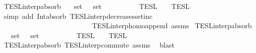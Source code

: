 \begin{isabellebody}
\endisatagproof
{\isafoldproof}%
%
\isadelimproof
\isanewline
%
\endisadelimproof
\isanewline
{}\isamarkupfalse%
\ TESL{\isacharunderscore}interp{\isacharunderscore}absorb{}{\isacharcolon}\isanewline
\ \ \ {\isacartoucheopen}set\ {\isasymPhi}\ {\isasymsubseteq}\ set\ {\isasymPhi}\isanewline
\ \ \ \ \ {\isacartoucheopen}{\isasymlbrakk}{\isasymlbrakk}\ {\isasymPhi}\ {\isacharat}\ {\isasymPhi}\ {\isasymrbrakk}{\isasymrbrakk}\isactrlsub T\isactrlsub E\isactrlsub S\isactrlsub L\ {\isacharequal}\ {\isasymlbrakk}{\isasymlbrakk}\ {\isasymPhi}\ {\isasymrbrakk}{\isasymrbrakk}\isactrlsub T\isactrlsub E\isactrlsub S\isactrlsub L{\isacartoucheclose}\isanewline
%
\isadelimproof
%
\endisadelimproof
%
\isatagproof
{}\isamarkupfalse%
\ {\isacharparenleft}simp\ add{\isacharcolon}\ Int{\isacharunderscore}absorb{}\ TESL{\isacharunderscore}interp{\isacharunderscore}decreases{\isacharunderscore}setinc\isanewline
\ \ \ \ \ \ \ \ \ \ \ \ \ \ \ \ \ \ \ \ \ \ \ \ \ \ TESL{\isacharunderscore}interp{\isacharunderscore}homo{\isacharunderscore}append\ assms{\isacharparenright}%
\endisatagproof
{\isafoldproof}%
%
\isadelimproof
\isanewline
%
\endisadelimproof
\isanewline
{}\isamarkupfalse%
\ TESL{\isacharunderscore}interp{\isacharunderscore}absorb{}{\isacharcolon}\isanewline
\ \ \ {\isacartoucheopen}set\ {\isasymPhi}\ {\isasymsubseteq}\ set\ {\isasymPhi}\isanewline
\ \ \ \ \ {\isacartoucheopen}{\isasymlbrakk}{\isasymlbrakk}\ {\isasymPhi}\ {\isacharat}\ {\isasymPhi}\ {\isasymrbrakk}{\isasymrbrakk}\isactrlsub T\isactrlsub E\isactrlsub S\isactrlsub L\ {\isacharequal}\ {\isasymlbrakk}{\isasymlbrakk}\ {\isasymPhi}\ {\isasymrbrakk}{\isasymrbrakk}\isactrlsub T\isactrlsub E\isactrlsub S\isactrlsub L{\isacartoucheclose}\isanewline
%
\isadelimproof
%
\endisadelimproof
%
\isatagproof
{}\isamarkupfalse%
\ TESL{\isacharunderscore}interp{\isacharunderscore}absorb{}\ TESL{\isacharunderscore}interp{\isacharunderscore}commute\ assms\ \isamarkupfalse%
\ blast%
\endisatagproof
{\isafoldproof}%
%
\isadelimproof
%
\endisadelimproof
%
\isadelimdocument
%
\endisadelimdocument
%
\isatagdocument
%
\end{isabellebody}
